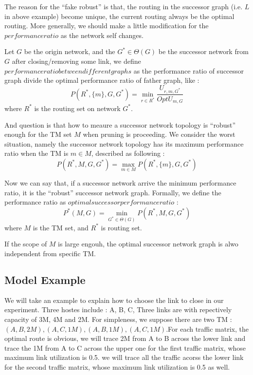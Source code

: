 \documentclass[conference]{IEEEtran}
\begin{document}
The reason for the ``fake robust'' is that, the routing in the successor graph (i.e. $L$ in above example) become 
unique, the current routing always be the optimal routing. More generally, we should make a little modification
for the $performance ratio$ as the network self changes.

Let $G$ be the origin network, and the $G^* \in \Theta(G)$ be the successor network from $G$ after closing/removing
some link, we define $performance ratio between different graphs$ as the performance ratio of successor graph divide 
the optimal performance ratio of father graph, like :
\begin{equation}
	P(R^*, \{ m\}, G, G^*) = \min_{r \in R^*} \frac{U_{r,m,G^*}}{OptU_{m,G}}
\end{equation}
where $R^*$ is the routing set on network $G^*$.

And question is that how to meaure a successor network topology is ``robust'' enough for the TM set $M$ when 
pruning is proceeding. We consider the worst situation, namely the successor network topology has its maximum
performance ratio when the TM is $m \in M$, described as following :
\begin{equation}
	P(R^*, M, G, G^*) = \max_{m \in M} P(R^*, \{ m \}, G, G^*)
\end{equation}

Now we can say that, if a successor network arrive the minimum performance ratio, it is the ``robust'' successor 
network graph. Formally, we define the performance ratio as $optimal successor performance ratio$ :
\begin{equation}
	P^{*}(M, G) = \min_{G^* \in \Theta(G)} P(R^*, M, G, G^*)
\end{equation}
where $M$ is the TM set, and $R^*$ is routing set. 

If the scope of $M$ is large engouh, the optimal successor network graph is alwo independent from specific TM. 

\subsection{Model Example}
We will take an example to explain how to choose the link to close in our experiment.
Three hostes include : A, B, C, Three links are with repectively capacity of 3M, 4M and 2M. For simpleness, we suppose 
there are two TM : ${(A,B,2M), (A,C,1M)}, {(A,B,1M), (A,C,1M)}$.For each traffic matrix, the optimal route is 
obvious, we will trace 2M from A to B across the lower link and trace the 1M from A to C across the upper one 
for the first traffic matrix, whose maximum link utilization is 0.5. we will trace all the traffic acorss the
lower link for the second traffic matrix, whose maximum link utilization is 0.5 as well.
\end{document}

